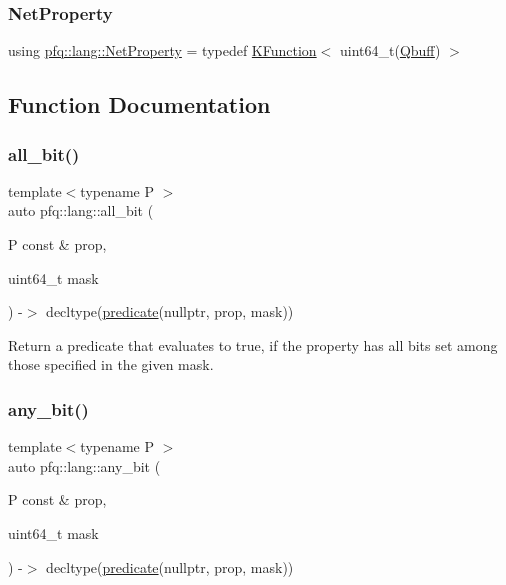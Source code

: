 \subsubsection{\texorpdfstring{Net\+Property}{NetProperty}}
{\footnotesize\ttfamily using \hyperlink{namespacepfq_1_1lang_a0c784c3d4623b8b9fd1d8fd8f67a4854}{pfq\+::lang\+::\+Net\+Property} = typedef \hyperlink{structpfq_1_1lang_1_1KFunction}{K\+Function}$<$ uint64\+\_\+t(\hyperlink{structpfq_1_1lang_1_1Qbuff}{Qbuff}) $>$}



\subsection{Function Documentation}
\mbox{\label{namespacepfq_1_1lang_a62b1989f7b5d84549a99b1df46743bd6}} 
\subsubsection{\texorpdfstring{all\+\_\+bit()}{all\_bit()}}
{\footnotesize\ttfamily template$<$typename P $>$ \\
auto pfq\+::lang\+::all\+\_\+bit (\begin{DoxyParamCaption}\item[{P const \&}]{prop,  }\item[{uint64\+\_\+t}]{mask }\end{DoxyParamCaption}) -\/$>$ decltype(\hyperlink{namespacepfq_1_1lang_aca9adafc436b7f851621b979fa1aaf88}{predicate}(nullptr, prop, mask))
    \hspace{0.3cm}{\ttfamily [inline]}}



Return a predicate that evaluates to {\ttfamily true}, if the property has all bits set among those specified in the given mask. 

\mbox{\label{namespacepfq_1_1lang_ac247c3827084d381d8518dabfff43bb2}} 
\subsubsection{\texorpdfstring{any\+\_\+bit()}{any\_bit()}}
{\footnotesize\ttfamily template$<$typename P $>$ \\
auto pfq\+::lang\+::any\+\_\+bit (\begin{DoxyParamCaption}\item[{P const \&}]{prop,  }\item[{uint64\+\_\+t}]{mask }\end{DoxyParamCaption}) -\/$>$ decltype(\hyperlink{namespacepfq_1_1lang_aca9adafc436b7f851621b979fa1aaf88}{predicate}(nullptr, prop, mask))
    \hspace{0.3cm}{\ttfamily [inline]}}



